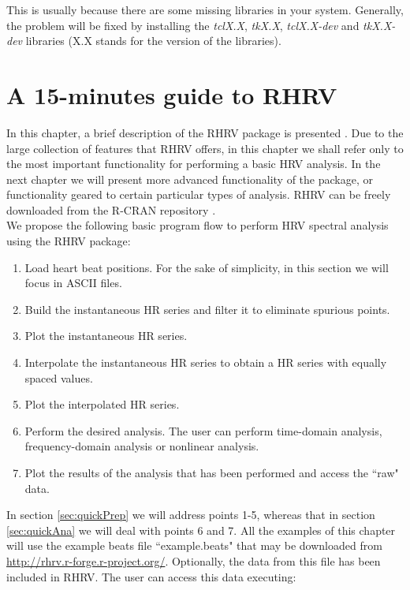 \documentclass[12pt,lot, lof]{puthesis}
\begin{document}
This is usually because there are some missing libraries in your system. 
Generally, the problem will be fixed by installing the \textit{tclX.X}, 
\textit{tkX.X}, \textit{tclX.X-dev} and  \textit{tkX.X-dev} libraries (X.X 
stands for the version of the libraries). 


\chapter{A 15-minutes guide to RHRV\label{ch:Quick}}
In this chapter, a brief description of the RHRV package is presented 
\cite{vilaRHRV}. Due to the large collection of features that RHRV offers, in 
this chapter we shall refer only to the most important functionality for 
performing  a basic \gls{HRV} analysis. In the next chapter we will present 
more advanced functionality of the package, or functionality geared to certain 
particular types of analysis. RHRV can be freely downloaded from the R-CRAN 
repository \cite{cran}.\\

We propose the following basic program flow to perform \gls{HRV} spectral 
analysis using the RHRV package:

\begin{enumerate}
\item Load heart beat positions. For the sake of simplicity, in this section we 
will focus in
ASCII files. 
\item Build the instantaneous \gls{HR} series and filter it to eliminate 
spurious points.
\item Plot the instantaneous \gls{HR} series.
\item Interpolate the instantaneous \gls{HR} series to obtain a \gls{HR} series 
with equally spaced values.
\item Plot the interpolated \gls{HR} series.
\item Perform the desired analysis. The user can perform time-domain analysis, 
frequency-domain analysis or nonlinear analysis.
\item Plot the results of the analysis that has been performed and access the 
``raw" data.
\end{enumerate}
In section \ref{sec:quickPrep} we will address points 1-5, whereas that in 
section \ref{sec:quickAna} we will deal with points 6 and 7. All the examples 
of this chapter will use the 
example beats file ``example.beats" that may be downloaded from 
\href{http://rhrv.r-forge.r-project.org/}{http://rhrv.r-forge.r-project.org/}. 
Optionally, the data from this file has been included in RHRV. The user can 
access this data executing:
\end{document}
